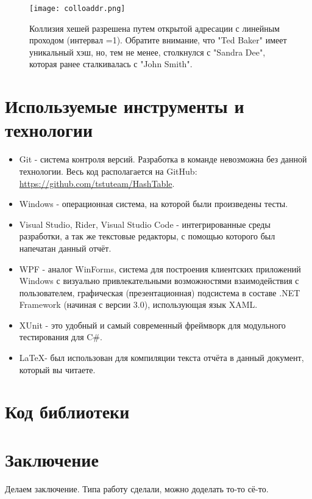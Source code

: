 \begin{figure}[H]
	\begin{center}
		\texttt{[image: colloaddr.png]}
		\caption{Коллизия хешей разрешена путем открытой адресации с линейным проходом (интервал =1). Обратите внимание, что "Ted Baker" имеет уникальный хэш, но, тем не менее, столкнулся с "Sandra Dee", которая ранее сталкивалась с "John Smith".}
	\end{center}
\end{figure}

\section{Используемые инструменты и технологии}

\begin{itemize}
	\item Git - система контроля версий. Разработка в команде невозможна без данной технологии. Весь код располагается на GitHub: \url{https://github.com/tstuteam/HashTable}.
	\item Windows - операционная система, на которой были произведены тесты.
	\item Visual Studio, Rider, Visual Studio Code - интегрированные среды разработки, а так же текстовые редакторы, с помощью которого был напечатан данный отчёт.
	\item WPF - аналог WinForms, система для построения клиентских приложений Windows с визуально привлекательными возможностями взаимодействия с пользователем, графическая (презентационная) подсистема в составе .NET Framework (начиная с версии 3.0), использующая язык XAML.
	\item XUnit - это удобный и самый современный фреймворк для модульного тестирования для C\#.
	\item \LaTeX - был использован для компиляции текста отчёта в данный документ, который вы читаете.
\end{itemize}

\section{Код библиотеки}

\begin{code}
	
	\caption{HashTable.cs - Код библиотеки}
\end{code}

\newpage
\section*{Заключение}
Делаем заключение. Типа работу сделали, можно доделать то-то сё-то.
